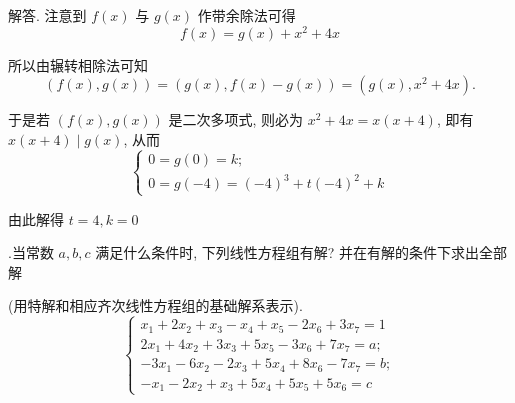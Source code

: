 \documentclass{article}
\begin{document}
解答. 注意到 $f(x)$ 与 $g(x)$ 作带余除法可得
$$
    f(x)=g(x)+x^{2}+4 x
$$

所以由辗转相除法可知
$$
    (f(x), g(x))=(g(x), f(x)-g(x))=\left(g(x), x^{2}+4 x\right) .
$$

于是若 $(f(x), g(x))$ 是二次多项式, 则必为 $x^{2}+4 x=x(x+4)$, 即有 $x(x+4) \mid g(x)$, 从而
$$
    \left\{\begin{array}{l}
        0=g(0)=k ; \\
        0=g(-4)=(-4)^{3}+t(-4)^{2}+k
    \end{array}\right.
$$

由此解得 $t=4, k=0$

\vspace{1ex}
{.}当常数 $a, b, c$ 满足什么条件时, 下列线性方程组有解? 并在有解的条件下求出全部解

(用特解和相应齐次线性方程组的基础解系表示).
$$
    \left\{\begin{array}{l}
        x_{1}+2 x_{2}+x_{3}-x_{4}+x_{5}-2 x_{6}+3 x_{7}=1    \\
        2 x_{1}+4 x_{2}+3 x_{3}+5 x_{5}-3 x_{6}+7 x_{7}=a ;  \\
        -3 x_{1}-6 x_{2}-2 x_{3}+5 x_{4}+8 x_{6}-7 x_{7}=b ; \\
        -x_{1}-2 x_{2}+x_{3}+5 x_{4}+5 x_{5}+5 x_{6}=c
    \end{array}\right.
$$
\end{document}
